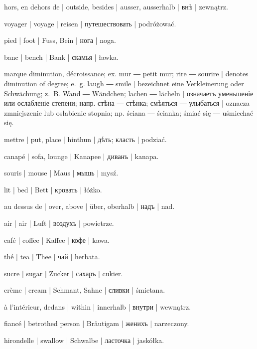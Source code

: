 \begin{ekzvocab}{1em}
 hors, en dehors de | outside, besides | ausser, ausserhalb | внѣ | zewnątrz.

 voyager | voyage | reisen | путешествовать | podróżować.

 pied | foot | Fuss, Bein | нога | noga.

 banc | bench | Bank | скамья | ławka.

 marque diminution, décroissance; ex.  mur ―  petit mur;  rire ―  sourire | denotes diminution of degree; e.~g.  laugh ―  smile | bezeichnet eine Verkleinerung oder Schwächung; z.~B.  Wand ―  Wändchen;  lachen ―  lächeln | означаетъ уменьшеніе или ослабленіе степени; напр.  стѣна ―  стѣнка;  смѣяться ―  улыбаться | oznacza zmniejszenie lub osłabienie stopnia; np.  ściana ―  ścianka;  śmiać się ―  uśmiechać się.

 mettre | put, place | hinthun | дѣть; класть | podziać.

 canapé | sofa, lounge | Kanapee | диванъ | kanapa.

 souris | mouse | Maus | мышь | mysź.

 lit | bed | Bett | кровать | łóżko.

 au dessus de | over, above | über, oberhalb | надъ | nad.

 air | air | Luft | воздухъ | powietrze.

 café | coffee | Kaffee | кофе | kawa.

 thé | tea | Thee | чай | herbata.

 sucre | sugar | Zucker | сахаръ | cukier.

 crème | cream | Schmant, Sahne | сливки | śmietana.

 à l’intérieur, dedans | within | innerhalb | внутри | wewnątrz.

 fiancé | betrothed person | Bräutigam | женихъ | narzeczony.

 hirondelle | swallow | Schwalbe | ласточка | jaskółka.


\end{ekzvocab}
